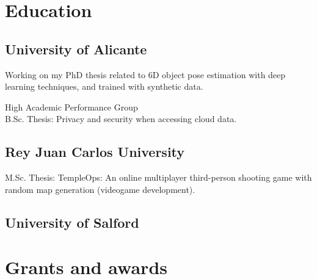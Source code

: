 \documentclass[]{deedy-resume-openfont}
\begin{document}
\begin{minipage}[t]{0.495\textwidth} 


\section{Education} 

\subsection{University of Alicante}
Working on my PhD thesis related to 6D object pose estimation with deep learning techniques, and trained with synthetic data.

\sectionsep

High Academic Performance Group \\
B.Sc. Thesis: Privacy and security when accessing cloud data. 

\sectionsep


\sectionsep

\subsection{Rey Juan Carlos University}
M.Sc. Thesis: TempleOps: An online multiplayer third-person shooting game with random map generation (videogame development).

\sectionsep

\subsection{University of Salford}

\sectionsep

\section{Grants and awards}


\end{minipage}
\end{document}
